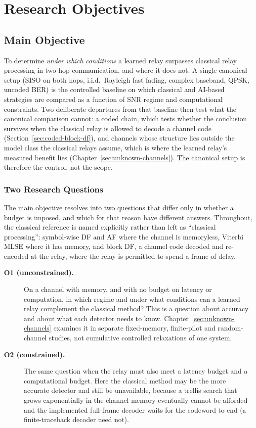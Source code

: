 \chapter{Research Objectives}\label{sec:research-objectives}

\section{Main Objective}\label{sec:main-objective}

To determine \emph{under which conditions} a learned relay surpasses classical relay processing in two-hop communication, and where it does not. A single canonical setup (SISO on both hops, i.i.d.\ Rayleigh fast fading, complex baseband, QPSK, uncoded BER) is the controlled baseline on which classical and AI-based strategies are compared as a function of SNR regime and computational constraints. Two deliberate departures from that baseline then test what the canonical comparison cannot: a coded chain, which tests whether the conclusion survives when the classical relay is allowed to decode a channel code (Section~\ref{sec:coded-block-df}), and channels whose structure lies outside the model class the classical relays assume, which is where the learned relay's measured benefit lies (Chapter~\ref{sec:unknown-channels}). The canonical setup is therefore the control, not the scope.

\subsection{Two Research Questions}\label{sec:two-objectives}

The main objective resolves into two questions that differ only in whether a budget is imposed, and which for that reason have different answers. Throughout, the classical reference is named explicitly rather than left as ``classical processing'': symbol-wise DF and AF where the channel is memoryless, Viterbi MLSE where it has memory, and block DF, a channel code decoded and re-encoded at the relay, where the relay is permitted to spend a frame of delay.

\begin{description}
\item[\textbf{O1 (unconstrained).}] On a channel with memory, and with no budget on latency or computation, in which regime and under what conditions can a learned relay complement the classical method? This is a question about accuracy and about what each detector needs to know. Chapter~\ref{sec:unknown-channels} examines it in separate fixed-memory, finite-pilot and random-channel studies, not cumulative controlled relaxations of one system.

\item[\textbf{O2 (constrained).}] The same question when the relay must also meet a latency budget and a computational budget. Here the classical method may be the more accurate detector and still be unavailable, because a trellis search that grows exponentially in the channel memory eventually cannot be afforded and the implemented full-frame decoder waits for the codeword to end (a finite-traceback decoder need not).
\end{description}

